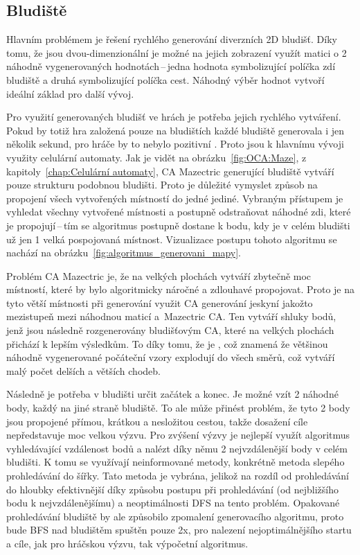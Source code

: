 \subsection*{Bludiště}
Hlavním problémem je řešení rychlého generování diverzních 2D bludišť. Díky tomu, že jsou dvou-dimenzionální je možné na jejich zobrazení využít matici o 2 náhodně vygenerovaných hodnotách\,--\,jedna hodnota symbolizující políčka zdí bludiště a druhá symbolizující políčka cest. Náhodný výběr hodnot vytvoří ideální základ pro další vývoj.

Pro využití generovaných bludišť ve hrách je potřeba jejich rychlého vytváření. Pokud by totiž hra založená pouze na bludištích každé bludiště generovala i jen několik sekund, pro hráče by to nebylo pozitivní . Proto jsou k hlavnímu vývoji využity celulární automaty. Jak je vidět na obrázku~\ref{fig:OCA:Maze}, z kapitoly~\ref{chap:Celulární automaty}, CA Mazectric generující bludiště vytváří pouze strukturu podobnou bludišti. Proto je důležité vymyslet způsob na propojení všech vytvořených místností do jedné jediné. Vybraným přístupem je vyhledat všechny vytvořené místnosti a postupně odstraňovat náhodné zdi, které je propojují\,--\,tím se algoritmus postupně dostane k bodu, kdy je v celém bludišti už jen 1 velká pospojovaná místnost. Vizualizace postupu tohoto algoritmu se nachází na obrázku~\ref{fig:algoritmus_generovani_mapy}.

Problém CA Mazectric je, že na velkých plochách vytváří zbytečně moc místností, které by bylo algoritmicky náročné a zdlouhavé propojovat. Proto je na tyto větší místnosti při generování využit CA generování jeskyní jakožto mezistupeň mezi náhodnou maticí a~Mazectric CA. Ten vytváří shluky bodů, jenž jsou následně rozgenerovány bludišťovým CA, které na velkých plochách přichází k lepším výsledkům. To díky tomu, že je , což znamená že většinou náhodně
vygenerované počáteční vzory explodují do všech směrů, což vytváří malý počet delších a větších chodeb.

Následně je potřeba v bludišti určit začátek a konec. Je možné vzít 2 náhodné body, každý na jiné straně bludiště. To ale může přinést problém, že tyto 2 body jsou propojené přímou, krátkou a nesložitou cestou, takže dosažení cíle nepředstavuje moc velkou výzvu. Pro zvýšení výzvy je nejlepší využít algoritmus vyhledávající vzdálenost bodů a nalézt díky němu 2 nejvzdálenější body v celém bludišti. K tomu se využívají neinformované metody, konkrétně metoda slepého prohledávání do šířky. Tato metoda je vybrána, jelikož na rozdíl od prohledávání do hloubky efektivnější díky způsobu postupu při prohledávání (od nejbližšího bodu k nejvzdálenějšímu) a neoptimálnosti DFS na tento problém. Opakované prohledávání bludiště by ale způsobilo zpomalení generovacího algoritmu, proto bude BFS nad bludištěm spuštěn pouze 2x, pro nalezení nejoptimálnějšího startu a cíle, jak pro hráčskou výzvu, tak výpočetní algoritmus.

